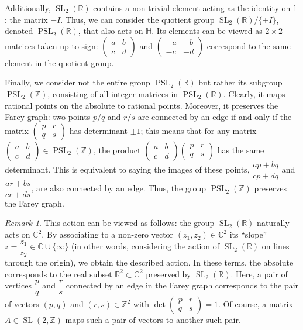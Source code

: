 \documentclass[a4paper,11pt]{amsart}
\newcommand{\CC}{{\mathbb{C}}}
\newcommand{\HH}{{\mathbb{H}}}
\newcommand{\RR}{{\mathbb{R}}}
\newcommand{\ZZ}{{\mathbb{Z}}}
\newcommand{\SL}{\mathop{\mathrm{SL}}}
\newcommand{\PSL}{\mathop{\mathrm{PSL}}}
\theoremstyle{plain}
\theoremstyle{remark}
\newtheorem{remark}[theorem]{Remark}
\theoremstyle{definition}
\numberwithin{equation}{section}
\numberwithin{figure}{section}
\begin{document}
Additionally, $\SL_2(\RR)$ contains a non-trivial element acting as the identity on $\HH$: the matrix $-I$. Thus, we can consider the quotient group $\SL_2(\RR)/\{\pm I\}$, denoted $\PSL_2(\RR)$, that also acts on $\HH$. Its elements can be viewed as $2\times 2$ matrices taken up to sign: $\begin{pmatrix}a&b\\c&d\end{pmatrix}$ and $\begin{pmatrix}-a&-b\\-c&-d\end{pmatrix}$ correspond to the same element in the quotient group.

Finally, we consider not the entire group $\PSL_2(\RR)$ but rather its subgroup $\PSL_2(\ZZ)$, consisting of all integer matrices in $\PSL_2(\RR)$. Clearly, it maps rational points on the absolute to rational points. Moreover, it preserves the Farey graph: two points $p/q$ and $r/s$ are connected by an edge if and only if the matrix $\begin{pmatrix}p&r\\q&s\end{pmatrix}$ has determinant $\pm 1$; this means that for any matrix $\begin{pmatrix}a&b\\c&d\end{pmatrix}\in\PSL_2(\ZZ)$, the product $\begin{pmatrix}a&b\\c&d\end{pmatrix}\begin{pmatrix}p&r\\q&s\end{pmatrix}$ has the same determinant. This is equivalent to saying the images of these points, $\dfrac{ap+bq}{cp+dq}$ and $\dfrac{ar+bs}{cr+ds}$, are also connected by an edge. Thus, the group $\PSL_2(\ZZ)$ preserves the Farey graph.

\begin{remark} This action can be viewed as follows: the group $\SL_2(\RR)$ naturally acts on $\CC^2$. By associating to a non-zero vector $(z_1, z_2)\in \CC^2$ its ``slope'' $z=\dfrac{z_1}{z_2}\in \CC \cup\{\infty\}$ (in other words, considering the action of $\SL_2(\RR)$ on lines through the origin), we obtain the described action. In these terms, the absolute corresponds to the real subset $\RR^2\subset \CC^2$ preserved by $\SL_2(\RR)$. Here, a pair of vertices $\dfrac pq$ and $\dfrac rs$ connected by an edge in the Farey graph corresponds to the pair of vectors $(p,q)$ and $(r,s)\in \ZZ^2$ with $\det\left(\begin{matrix}p &r\\q&s\end{matrix}\right)=1$. Of course, a matrix $A\in \SL(2,\ZZ)$ maps such a pair of vectors to another such pair.
\end{remark}
\end{document}
